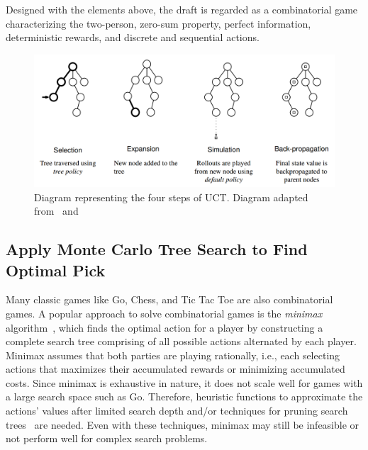 Designed with the elements above, the draft is regarded as a combinatorial game characterizing the two-person, zero-sum property, perfect information, deterministic rewards, and discrete and sequential actions. 


\begin{figure}
\centering
\includegraphics[width=1\textwidth]{Figures/mcts_plot.png}
\caption{Diagram representing the four steps of UCT. Diagram adapted from~\cite{browne2012survey} and~\cite{santos2017monte}}
\label{fig:mctsplot}
\end{figure}

\subsection{Apply Monte Carlo Tree Search to Find Optimal Pick}\label{sec:mcts}
Many classic games like Go, Chess, and Tic Tac Toe are also combinatorial games. A popular approach to solve combinatorial games is the \textit{minimax} algorithm~\cite{knuth1975analysis}, which finds the optimal action for a player by constructing a complete search tree comprising of all possible actions alternated by each player. Minimax assumes that both parties are playing rationally, i.e., each selecting actions that maximizes their accumulated rewards or minimizing accumulated costs. Since minimax is exhaustive in nature, it does not scale well for games with a large search space such as Go. Therefore, heuristic functions to approximate the actions' values after limited search depth and/or techniques for pruning search trees~\cite{knuth1975analysis} are needed. Even with these techniques, minimax may still be infeasible or not perform well for complex search problems. 



